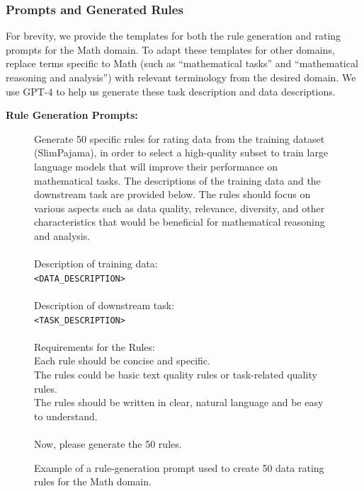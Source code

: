 \documentclass{article}
\begin{document}
\subsubsection{Prompts and Generated Rules}\label{subsubsec:Appendix-EvalB-Prompts-Rules}
\label{subsubsec:Appendix-EvalB-Prompt-Rules}
For brevity, we provide the templates for both the rule generation and rating prompts for the Math domain. To adapt these templates for other domains, replace terms specific to Math (such as “mathematical tasks” and “mathematical reasoning and analysis”) with relevant terminology from the desired domain. We use GPT-4 to help us generate these task description and data descriptions.

\textbf{Rule Generation Prompts:} 
\begin{figure}[H]
\centering
\small
\begin{tcolorbox}[colback=cyan!10!white, %
                  colframe=cyan!30!white, %
                  width=0.99\textwidth, %
                  arc=4mm, %
                  auto outer arc,
                  ]
Generate 50 specific rules for rating data from the training dataset (SlimPajama), in order to select a high-quality subset to train large language models that will improve their performance on mathematical tasks. The descriptions of the training data and the downstream task are provided below. The rules should focus on various aspects such as data quality, relevance, diversity, and other characteristics that would be beneficial for mathematical reasoning and analysis.\\
\\
Description of training data:\\
\texttt{\color{red}<DATA\_DESCRIPTION>}\\
\\
Description of downstream task:\\
\texttt{\color{red}<TASK\_DESCRIPTION>}\\
\\
Requirements for the Rules:\\
Each rule should be concise and specific.\\
The rules could be basic text quality rules or task-related quality rules.\\
The rules should be written in clear, natural language and be easy to understand.\\
\\
Now, please generate the 50 rules.
\end{tcolorbox}
\caption{Example of a rule-generation prompt used to create 50 data rating rules for the Math domain.}
\label{tab:rule_generation_prompt}
\end{figure}
\end{document}
